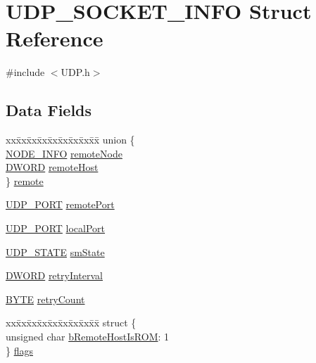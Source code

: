 \hypertarget{struct_u_d_p___s_o_c_k_e_t___i_n_f_o}{}\section{U\+D\+P\+\_\+\+S\+O\+C\+K\+E\+T\+\_\+\+I\+N\+F\+O Struct Reference}
\label{struct_u_d_p___s_o_c_k_e_t___i_n_f_o}


{\ttfamily \#include $<$U\+D\+P.\+h$>$}

\subsection*{Data Fields}
\begin{DoxyCompactItemize}
\item 
\begin{tabbing}
xx\=xx\=xx\=xx\=xx\=xx\=xx\=xx\=xx\=\kill
union \{\\
\>\hyperlink{_stack_tsk_8h_ac28a7d4076195ab8e3376f06055f8ee4}{NODE\_INFO} \hyperlink{struct_u_d_p___s_o_c_k_e_t___i_n_f_o_a6b16370945614af823875b6bf9f2e94f}{remoteNode}\\
\>\hyperlink{_generic_type_defs_8h_ad342ac907eb044443153a22f964bf0af}{DWORD} \hyperlink{struct_u_d_p___s_o_c_k_e_t___i_n_f_o_aba2193fca38daca2c6509926273f5313}{remoteHost}\\
\} \hyperlink{struct_u_d_p___s_o_c_k_e_t___i_n_f_o_ab2411a604a240dec78163b80552ea3fb}{remote}\\

\end{tabbing}\item 
\hyperlink{_u_d_p_8h_abe6e72d540ec531acbd9d7d8a72922a5}{U\+D\+P\+\_\+\+P\+O\+R\+T} \hyperlink{struct_u_d_p___s_o_c_k_e_t___i_n_f_o_aa22208b7c22485b124a45d1bf1a45730}{remote\+Port}
\item 
\hyperlink{_u_d_p_8h_abe6e72d540ec531acbd9d7d8a72922a5}{U\+D\+P\+\_\+\+P\+O\+R\+T} \hyperlink{struct_u_d_p___s_o_c_k_e_t___i_n_f_o_aa878c6a5e72a4bc00ec8731c2e45b50b}{local\+Port}
\item 
\hyperlink{_u_d_p_8h_a9a877d35743ec846bb449ec827859e6e}{U\+D\+P\+\_\+\+S\+T\+A\+T\+E} \hyperlink{struct_u_d_p___s_o_c_k_e_t___i_n_f_o_ac0eb7113e023d3e694b1eba331a036cd}{sm\+State}
\item 
\hyperlink{_generic_type_defs_8h_ad342ac907eb044443153a22f964bf0af}{D\+W\+O\+R\+D} \hyperlink{struct_u_d_p___s_o_c_k_e_t___i_n_f_o_a807f78c2939992452223356ae72340cf}{retry\+Interval}
\item 
\hyperlink{_generic_type_defs_8h_a4ae1dab0fb4b072a66584546209e7d58}{B\+Y\+T\+E} \hyperlink{struct_u_d_p___s_o_c_k_e_t___i_n_f_o_a122f749211c26b45afbac25b4a278b56}{retry\+Count}
\item 
\begin{tabbing}
xx\=xx\=xx\=xx\=xx\=xx\=xx\=xx\=xx\=\kill
struct \{\\
\>unsigned char \hyperlink{struct_u_d_p___s_o_c_k_e_t___i_n_f_o_a85e50d5129c9eaec6e4729cb5aacf312}{bRemoteHostIsROM}: 1\\
\} \hyperlink{struct_u_d_p___s_o_c_k_e_t___i_n_f_o_a05d730e133ed985d14e938dc7d7a85cf}{flags}\\


\end{tabbing}
\end{DoxyCompactItemize}
